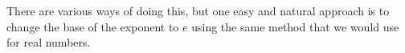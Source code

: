 There are various ways of doing this, but one easy and natural
approach is to change the base of the exponent to $e$ using the
same method that we would use for real numbers.
